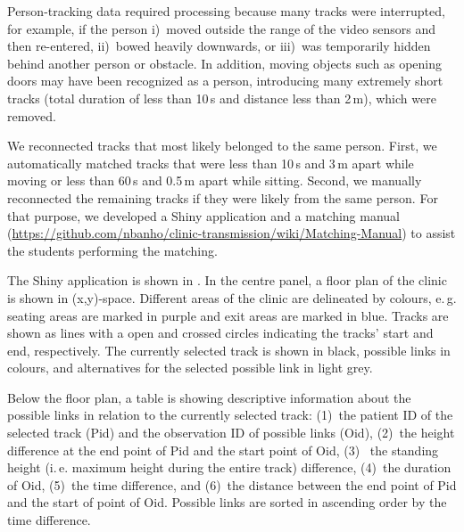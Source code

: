 \documentclass[fleqn,11pt]{wlscirep_supp}
\newcommand\ie{i.\,e.\xspace}
\newcommand\eg{e.\,g.\xspace}
\begin{document}
Person-tracking data required processing because many tracks were interrupted, for example, if the person i)~moved outside the range of the video sensors and then re-entered, ii)~bowed heavily downwards, or iii)~was temporarily hidden behind another person or obstacle. In addition, moving objects such as opening doors may have been recognized as a person, introducing many extremely short tracks (total duration of less than 10\,s and distance less than 2\,m), which were removed.

We reconnected tracks that most likely belonged to the same person. First, we automatically matched tracks that were less than 10\,s and 3\,m apart while moving or less than 60\,s and 0.5\,m apart while sitting. Second, we manually reconnected the remaining tracks if they were likely from the same person. For that purpose, we developed a Shiny application and a matching manual (\url{https://github.com/nbanho/clinic-transmission/wiki/Matching-Manual}) to assist the students performing the matching. 

The Shiny application is shown in . In the centre panel, a floor plan of the clinic is shown in (x,y)-space. Different areas of the clinic are delineated by colours, \eg seating areas are marked in purple and exit areas are marked in blue. Tracks are shown as lines with a open and crossed circles indicating the tracks' start and end, respectively. The currently selected track is shown in black, possible links in colours, and alternatives for the selected possible link in light grey. 

Below the floor plan, a table is showing descriptive information about the possible links in relation to the currently selected track: (1)~the patient ID of the selected track (Pid) and the observation ID of possible links (Oid), (2)~the height difference at the end point of Pid and the start point of Oid, (3)~ the standing height (\ie maximum height during the entire track) difference, (4)~the duration of Oid, (5)~the time difference, and (6)~the distance between the end point of Pid and the start of point of Oid. Possible links are sorted in ascending order by the time difference. 
\end{document}
